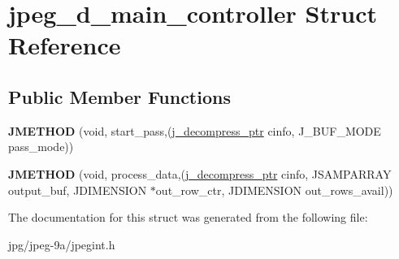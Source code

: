 \hypertarget{structjpeg__d__main__controller}{\section{jpeg\+\_\+d\+\_\+main\+\_\+controller Struct Reference}
\label{structjpeg__d__main__controller}
}
\subsection*{Public Member Functions}
\begin{DoxyCompactItemize}
\item 
\hypertarget{structjpeg__d__main__controller_a6fd68ad0d0296dcc299119db1128c294}{{\bfseries J\+M\+E\+T\+H\+O\+D} (void, start\+\_\+pass,(\hyperlink{structjpeg__decompress__struct}{j\+\_\+decompress\+\_\+ptr} cinfo, J\+\_\+\+B\+U\+F\+\_\+\+M\+O\+D\+E pass\+\_\+mode))}\label{structjpeg__d__main__controller_a6fd68ad0d0296dcc299119db1128c294}

\item 
\hypertarget{structjpeg__d__main__controller_affd488d3ef78b5080ec5b2a00c8198a5}{{\bfseries J\+M\+E\+T\+H\+O\+D} (void, process\+\_\+data,(\hyperlink{structjpeg__decompress__struct}{j\+\_\+decompress\+\_\+ptr} cinfo, J\+S\+A\+M\+P\+A\+R\+R\+A\+Y output\+\_\+buf, J\+D\+I\+M\+E\+N\+S\+I\+O\+N $\ast$out\+\_\+row\+\_\+ctr, J\+D\+I\+M\+E\+N\+S\+I\+O\+N out\+\_\+rows\+\_\+avail))}\label{structjpeg__d__main__controller_affd488d3ef78b5080ec5b2a00c8198a5}

\end{DoxyCompactItemize}


The documentation for this struct was generated from the following file\+:\begin{DoxyCompactItemize}
\item 
jpg/jpeg-\/9a/jpegint.\+h\end{DoxyCompactItemize}
